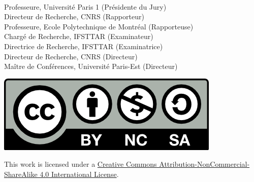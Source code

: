 \begin{titlepage}
\begin{addmargin}[-1cm]{-3cm}
\begin{center}
\begin{adjustwidth*}{-0.5cm}{-2cm}
\begin{minipage}{0.28\linewidth}
\raggedright
\textbf{}\\
\textbf{}\\
\textbf{}\\
\textbf{}\\
\textbf{}\\
\textbf{}\\
\textbf{}
\end{minipage}
\begin{minipage}{0.7\linewidth}
\raggedright
Professeure, Université Paris 1 (Présidente du Jury)\\
Directeur de Recherche, CNRS (Rapporteur)\\
Professeure, Ecole Polytechnique de Montréal (Rapporteuse)\\
Chargé de Recherche, IFSTTAR (Examinateur)\\
Directrice de Recherche, IFSTTAR (Examinatrice)\\
Directeur de Recherche, CNRS (Directeur)\\
Maître de Conférences, Université Paris-Est (Directeur)\\
\end{minipage}
\end{adjustwidth*}

\vspace{2cm}

\begin{minipage}{0.28\linewidth}
	\includegraphics[width=\textwidth]{Figures/Art/by-nc-sa.png}
\end{minipage}
\hfill
\begin{minipage}{0.7\linewidth}
This work is licensed under a \href{http://creativecommons.org/licenses/by-nc-sa/4.0/}{Creative Commons Attribution-NonCommercial-ShareAlike 4.0 International License}.
\end{minipage}


\end{center}
\end{addmargin}

\end{titlepage}




